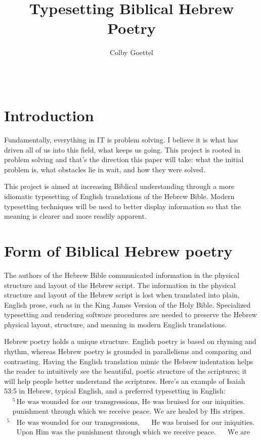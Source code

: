 \documentclass{acm_proc_article-sp}
\title{Typesetting Biblical Hebrew Poetry}
\author{
\alignauthor
Colby Goettel\\
       \affaddr{Brigham Young University}\\
       \affaddr{Provo, UT 84602}\\
       \email{colby.goettel@gmail.com}
}
\begin{document}
\maketitle

\section{Introduction}
Fundamentally, everything in IT is problem solving. I believe it is what has driven all of us into this field, what keeps us going. This project is rooted in problem solving and that's the direction this paper will take: what the initial problem is, what obstacles lie in wait, and how they were solved.

This project is aimed at increasing Biblical understanding through a more idiomatic typesetting of English translations of the Hebrew Bible. Modern typesetting techniques will be used to better display information so that the meaning is clearer and more readily apparent.

\section{Form of Biblical Hebrew poetry}
The authors of the Hebrew Bible communicated information in the physical structure and layout of the Hebrew script. The information in the physical structure and layout of the Hebrew script is lost when translated into plain, English prose, such as in the King James Version of the Holy Bible. Specialized typesetting and rendering software procedures are needed to preserve the Hebrew physical layout, structure, and meaning in modern English translations.

Hebrew poetry holds a unique structure. English poetry is based on rhyming and rhythm, whereas Hebrew poetry is grounded in parallelisms and comparing and contrasting. Having the English translation mimic the Hebrew indentation helps the reader to intuitively see the beautiful, poetic structure of the scriptures; it will help people better understand the scriptures. Here's an example of Isaiah 53:5 in Hebrew, typical English, and a preferred typesetting in English:
\begin{align}
    &^5\,\text{He was wounded for our transgressions, He was bruised for our iniquities. Upon Him was the} \\
    &\text{punishment through which we receive peace. We are healed by His stripes.}
\end{align}
\begin{align}
    ^5\,&\text{He was wounded for our transgressions, ~~~~He was bruised for our iniquities.} \\
        &\text{Upon Him was the punishment through which we receive peace. ~~~~We are healed by His stripes.}
\end{align}
\end{document}
